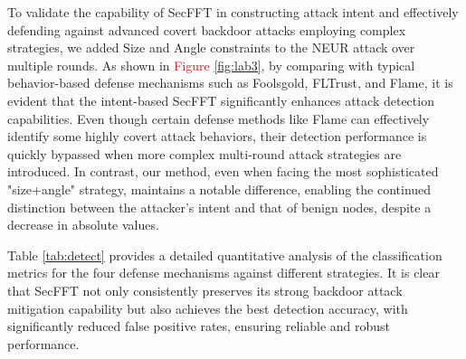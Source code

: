 \documentclass[lettersize,journal]{IEEEtran}
\begin{document}
To validate the capability of SecFFT in constructing attack intent and effectively defending against advanced covert backdoor attacks employing complex strategies, we added Size and Angle constraints to the NEUR attack over multiple rounds. As shown in \textcolor{red}{Figure \ref{fig:lab3}}, by comparing with typical behavior-based defense mechanisms such as Foolsgold, FLTrust, and Flame, it is evident that the intent-based SecFFT significantly enhances attack detection capabilities. Even though certain defense methods like Flame can effectively identify some highly covert attack behaviors, their detection performance is quickly bypassed when more complex multi-round attack strategies are introduced. In contrast, our method, even when facing the most sophisticated "size+angle" strategy, maintains a notable difference, enabling the continued distinction between the attacker's intent and that of benign nodes, despite a decrease in absolute values.

Table \ref{tab:detect} provides a detailed quantitative analysis of the classification metrics for the four defense mechanisms against different strategies. It is clear that SecFFT not only consistently preserves its strong backdoor attack mitigation capability but also achieves the best detection accuracy, with significantly reduced false positive rates, ensuring reliable and robust performance.

\end{document}
